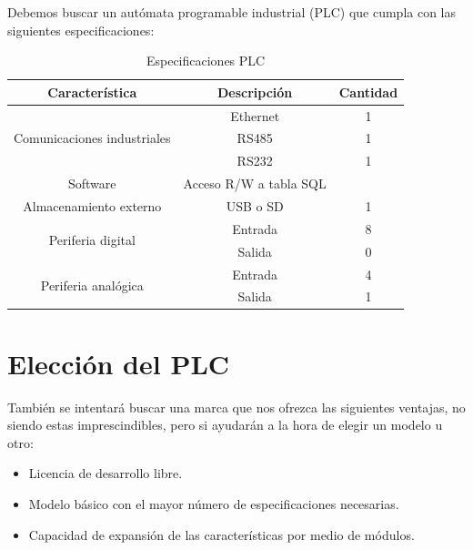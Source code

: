 Debemos buscar un autómata programable industrial (PLC) que cumpla con las siguientes especificaciones:

\begin{table}[H]
\centering
\begin{tabular}{|c|c|c|}
\hline
\textbf{Característica }                              & \textbf{Descripción}            & \textbf{Cantidad} \\ \hline
\multirow{3}{*}{Comunicaciones industriales} & Ethernet               & 1        \\ \cline{2-3} 
                                             & RS485                  & 1        \\ \cline{2-3} 
                                             & RS232                  & 1        \\ \hline
Software                                     & Acceso R/W a tabla SQL &          \\ \hline
Almacenamiento externo                       & USB o SD               & 1        \\ \hline
\multirow{2}{*}{Periferia digital}           & Entrada                & 8        \\ \cline{2-3} 
                                             & Salida                 & 0        \\ \hline
\multirow{2}{*}{Periferia analógica}         & Entrada                & 4        \\ \cline{2-3} 
                                             & Salida                 & 1        \\ \hline
\end{tabular}
\caption{Especificaciones PLC}
\label{tab:espc_plc}
\end{table}

\section{Elección del PLC}
\label{eleccion_PLC}

También se intentará buscar una marca que nos ofrezca las siguientes ventajas, no siendo estas imprescindibles, pero si ayudarán a la hora de elegir un modelo u otro:

\begin{itemize}
		\item{Licencia de desarrollo libre.}
		\item{Modelo básico con el mayor número de especificaciones necesarias.}
		\item{Capacidad de expansión de las características por medio de módulos.}
\end{itemize}

